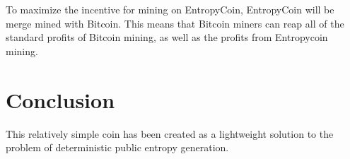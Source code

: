 \documentclass[twocolumn]{article}
\begin{document}
To maximize the incentive for mining on EntropyCoin, EntropyCoin will be merge mined with Bitcoin.
This means that Bitcoin miners can reap all of the standard profits of Bitcoin mining, as well as the profits from Entropycoin mining.

\section{Conclusion}
This relatively simple coin has been created as a lightweight solution to the problem of deterministic public entropy generation.
\end{document}
